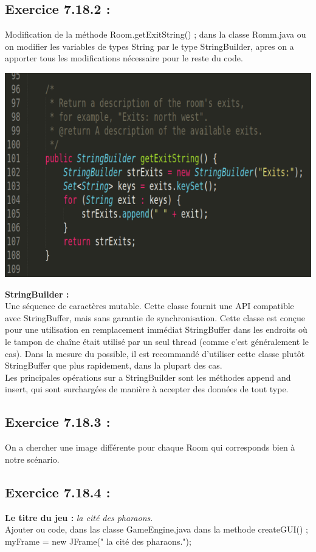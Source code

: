\documentclass[french,10pt,a4paper]{report}
\begin{document}
\subsection{\textcolor{bb}{Exercice 7.18.2 :}}
Modification de la méthode Room.getExitString() ; dans la classe Romm.java ou on modifier les variables de types String par le type StringBuilder, apres on a apporter tous les modifications nécessaire pour le reste du code.
\begin{center}
	\includegraphics[scale=0.3]{captures/it2_2.png}
\end{center}
\textbf{StringBuilder :}\\Une séquence de caractères mutable. Cette classe fournit une API compatible avec StringBuffer, mais sans garantie de synchronisation. Cette classe est conçue pour une utilisation en remplacement immédiat StringBuffer dans les endroits où le tampon de chaîne était utilisé par un seul thread (comme c'est généralement le cas). Dans la mesure du possible, il est recommandé d'utiliser cette classe plutôt StringBuffer que plus rapidement, dans la plupart des cas.\\
Les principales opérations sur a StringBuilder sont les méthodes append and insert, qui sont surchargées de manière à accepter des données de tout type.

\subsection{\textcolor{bb}{Exercice 7.18.3 :}}
On a chercher une image différente pour chaque Room qui corresponds bien à notre scénario.

\subsection{\textcolor{bb}{Exercice 7.18.4 :}}
\textbf{Le titre du jeu :} \textit{\textcolor{gg}{la cité des pharaons}}.\\
Ajouter ou code, dans las classe GameEngine.java dans la methode createGUI() ;\\
myFrame = new JFrame(\textcolor{gg}{" la cité des pharaons."});
\end{document}
